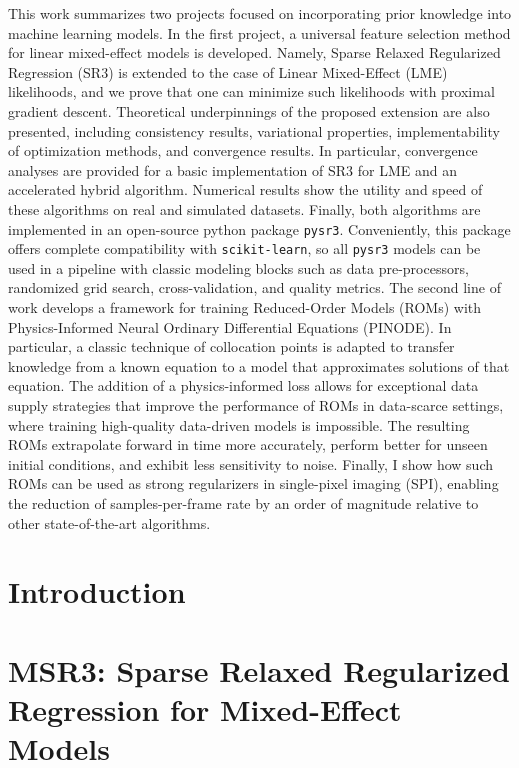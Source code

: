 \documentclass[12pt,a4paper]{book}
\numberwithin{equation}{section} %
\numberwithin{figure}{section} %
\numberwithin{table}{section} %
\begin{document}
This work summarizes two projects focused on incorporating prior knowledge into machine learning models. In the first project, a universal feature selection method for linear mixed-effect models is developed. Namely, Sparse Relaxed Regularized Regression (SR3) is extended to the case of Linear Mixed-Effect (LME) likelihoods, and we prove that one can minimize such likelihoods with proximal gradient descent. Theoretical underpinnings of the proposed extension are also presented, including consistency results, variational properties, implementability of optimization methods, and convergence results. In particular, convergence analyses are provided for a basic implementation of SR3 for LME and an accelerated hybrid algorithm. Numerical results show the utility and speed of these algorithms on real and simulated datasets. Finally, both algorithms are implemented in an open-source python package \texttt{pysr3}. Conveniently, this package offers complete compatibility with \texttt{scikit-learn}, so all \texttt{pysr3} models can be used in a pipeline with classic modeling blocks such as data pre-processors, randomized grid search, cross-validation, and quality metrics. The second line of work develops a framework for training Reduced-Order Models (ROMs) with Physics-Informed Neural Ordinary Differential Equations (PINODE). In particular, a classic technique of collocation points is adapted to transfer knowledge from a known equation to a model that approximates solutions of that equation. The addition of a physics-informed loss allows for exceptional data supply strategies that improve the performance of ROMs in data-scarce settings, where training high-quality data-driven models is impossible. The resulting ROMs extrapolate forward in time more accurately, perform better for unseen initial conditions, and exhibit less sensitivity to noise. Finally, I show how such ROMs can be used as strong regularizers in single-pixel imaging (SPI), enabling the reduction of samples-per-frame rate by an order of magnitude relative to other state-of-the-art algorithms.

\newpage
\tableofcontents

\chapter*{Introduction}


\chapter{MSR3: Sparse Relaxed Regularized Regression for Mixed-Effect Models}
\label{ch:msr3}

\end{document}
